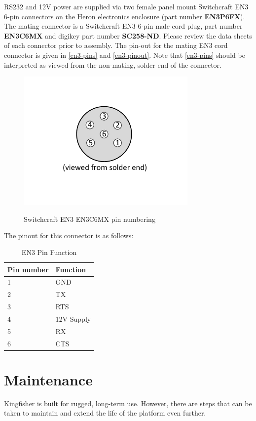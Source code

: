 \documentclass[]{clearpath-latex/clearpath-manual}
\begin{document}
RS232 and 12V power are supplied via two female panel mount Switchcraft EN3 6-pin connectors on the Heron electronics enclosure (part number \textbf{EN3P6FX}).  The mating connector is a Switchcraft EN3 6-pin male cord plug, part number \textbf{EN3C6MX} and digikey part number \textbf{SC258-ND}. Please review the data sheets of each connector prior to assembly. The pin-out for the mating EN3 cord connector is given in \autoref{en3-pins} and \autoref{en3-pinout}. Note that \autoref{en3-pins} should be interpreted as viewed from the non-mating, solder end of the connector. 

\begin{figure}[h]
  \centering
  \includegraphics[width=0.5\linewidth]{en3-pinout2.pdf}
  \label{en3-pins}
  \caption{Switchcraft EN3 EN3C6MX pin numbering }
\end{figure}


The pinout for this connector is as follows:


\begin{table}[h]
\centering
\label{en3-pinout}
\begin{tabular}{|l|l|} 
Pin number  & Function \\
\hline
1  & GND              \\ \hline
2  & TX  \\ \hline
3  & RTS  \\ \hline
4  & 12V Supply            \\ \hline
5  & RX             \\ \hline
6  & CTS            \\ \hline

\end{tabular}
\caption{EN3 Pin Function}
\end{table}



\newpage

\section{Maintenance}
Kingfisher is built for rugged, long-term use. However, there are steps that can be taken to maintain and extend the life of the platform even further.
\end{document}
